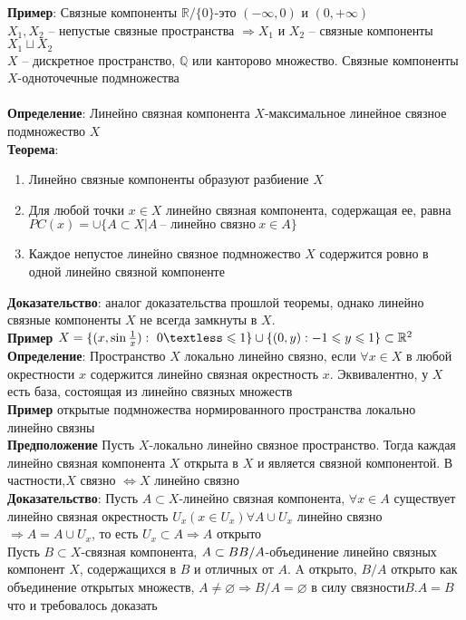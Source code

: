 	\textbf{Пример}: Связные компоненты $\mathbb{R} \slash \{0\}$-это $( - \infty , 0)$ и $(0, + \infty)$\\
	$X_1,X_2$ -- непустые связные пространства $\Rightarrow X_1$ и $X_2$ -- связные компоненты $X_1 \sqcup X_2$\\
	$X$ -- дискретное пространство, $\mathbb{Q}$ или канторово множество. Связные компоненты $X$-одноточечные подмножества\\
	\\
	\textbf{Определение}: Линейно связная компонента $X$-максимальное линейное связное подмножество $X$\\
	\textbf{Теорема}:
	\begin{enumerate}
		\item 
		Линейно связные компоненты образуют разбиение $X$
		\item 
		Для любой точки $x\in X$ линейно связная компонента, содержащая ее, равна\\ $PC(x)=\cup \{A\subset X| A\ \text{-- линейно связно}\  x\in A\}$
		\item 
		Каждое непустое линейно связное подмножество $X$ содержится ровно в одной линейно связной компоненте
	\end{enumerate}
	\textbf{Доказательство}: аналог доказательства прошлой теоремы, однако линейно связные компоненты $X$ не всегда замкнуты в $X$.\\
	\textbf{Пример} $X=\{(x,\sin{\frac{1}{x}}):\ 0 \textless \leqslant 1\} \cup \{(0,y):- 1\leqslant y \leqslant 1\} \subset \mathbb{R}^2$\\
	\textbf{Определение}: Пространство $X$ локально линейно связно, если $\forall x\in X$ в любой окрестности $x$ содержится линейно связная окрестность $x$. Эквивалентно, у $X$ есть база, состоящая из линейно связных множеств\\
	\textbf{Пример} открытые подмножества нормированного пространства локально линейно связны\\
	\textbf{Предположение} Пусть $X$-локально линейно связное пространство. Тогда каждая линейно связная компонента $X$ открыта в $X$ и является связной компонентой. В частности,$X$ связно $\Leftrightarrow X$ линейно связно\\
	\textbf{Доказательство}: Пусть $A\subset X$-линейно связная компонента, $\forall x\in A$ существует линейно связная окрестность $U_x(x\in U_x) \forall A\cup U_x$ линейно связно $\Rightarrow A=A\cup U_x$, то есть $U_x \subset A \Rightarrow A$ открыто\\
	Пусть $B\subset X$-связная компонента, $A\subset B\\
	B\slash A$-объединение линейно связных компонент $X$, содержащихся в $B$ и отличных от $A$. A открыто, $B\slash A$ открыто как объединение открытых множеств, $A \neq \varnothing \Rightarrow B\slash A=\varnothing$ в силу связности$ B. A=B$ что и требовалось доказать
	

